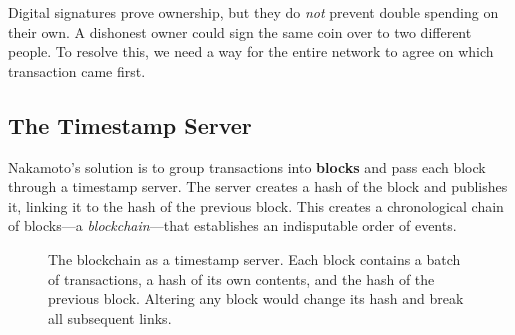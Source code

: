 Digital signatures prove ownership, but they do \emph{not} prevent double spending on their own. A dishonest owner could sign the same coin over to two different people. To resolve this, we need a way for the entire network to agree on which transaction came first.

\subsection{The Timestamp Server}
\label{sec:timestamp}

Nakamoto's solution is to group transactions into \textbf{blocks} and pass each block through a timestamp server. The server creates a hash of the block and publishes it, linking it to the hash of the previous block. This creates a chronological chain of blocks---a \emph{blockchain}---that establishes an indisputable order of events.

\begin{figure}[htbp]
\centering
{}
\caption{The blockchain as a timestamp server. Each block contains a batch of transactions, a hash of its own contents, and the hash of the previous block. Altering any block would change its hash and break all subsequent links.}
\label{fig:timestamp-chain}
\end{figure}

